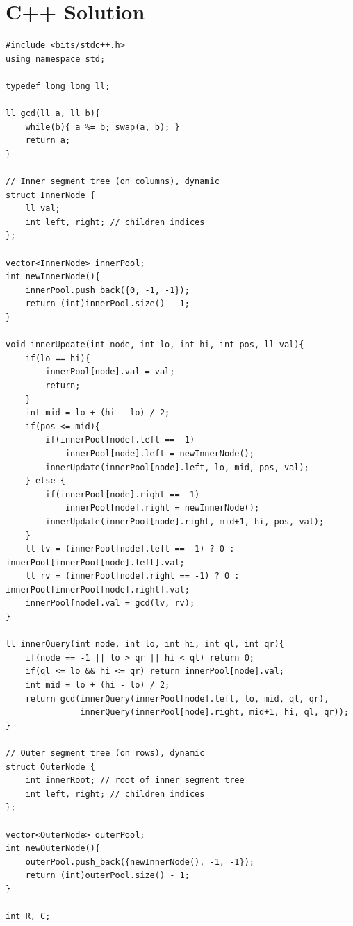 \documentclass[11pt,a4paper]{article}
\begin{document}
\section{C++ Solution}
\begin{lstlisting}
#include <bits/stdc++.h>
using namespace std;

typedef long long ll;

ll gcd(ll a, ll b){
    while(b){ a %= b; swap(a, b); }
    return a;
}

// Inner segment tree (on columns), dynamic
struct InnerNode {
    ll val;
    int left, right; // children indices
};

vector<InnerNode> innerPool;
int newInnerNode(){
    innerPool.push_back({0, -1, -1});
    return (int)innerPool.size() - 1;
}

void innerUpdate(int node, int lo, int hi, int pos, ll val){
    if(lo == hi){
        innerPool[node].val = val;
        return;
    }
    int mid = lo + (hi - lo) / 2;
    if(pos <= mid){
        if(innerPool[node].left == -1)
            innerPool[node].left = newInnerNode();
        innerUpdate(innerPool[node].left, lo, mid, pos, val);
    } else {
        if(innerPool[node].right == -1)
            innerPool[node].right = newInnerNode();
        innerUpdate(innerPool[node].right, mid+1, hi, pos, val);
    }
    ll lv = (innerPool[node].left == -1) ? 0 : innerPool[innerPool[node].left].val;
    ll rv = (innerPool[node].right == -1) ? 0 : innerPool[innerPool[node].right].val;
    innerPool[node].val = gcd(lv, rv);
}

ll innerQuery(int node, int lo, int hi, int ql, int qr){
    if(node == -1 || lo > qr || hi < ql) return 0;
    if(ql <= lo && hi <= qr) return innerPool[node].val;
    int mid = lo + (hi - lo) / 2;
    return gcd(innerQuery(innerPool[node].left, lo, mid, ql, qr),
               innerQuery(innerPool[node].right, mid+1, hi, ql, qr));
}

// Outer segment tree (on rows), dynamic
struct OuterNode {
    int innerRoot; // root of inner segment tree
    int left, right; // children indices
};

vector<OuterNode> outerPool;
int newOuterNode(){
    outerPool.push_back({newInnerNode(), -1, -1});
    return (int)outerPool.size() - 1;
}

int R, C;


\end{lstlisting}
\end{document}
